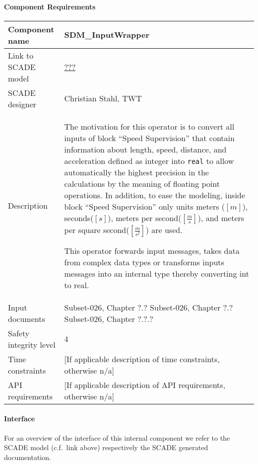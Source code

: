 
\paragraph{Component Requirements}

\begin{longtable}{p{}p{}}
\toprule
Component name			& SDM\_InputWrapper \\
\midrule
Link to SCADE model		& {\footnotesize \url{???}} \\
\midrule
SCADE designer			& Christian Stahl, TWT \\
\midrule
Description				& The motivation for this operator is to convert all inputs of block ``Speed Supervision'' that contain information about length, speed, distance, and acceleration defined as integer into \texttt{real} to allow automatically the highest precision in the calculations by the meaning of floating point operations. In addition, to ease the modeling, inside block ``Speed Supervision'' only units meters ($[m]$), seconds($[s]$), meters per second($[\frac{m}{s}]$), and meters per square second($[\frac{m}{s^{2}}]$) are used.

This operator forwards input messages, takes data from complex data types or transforms inputs messages into an internal type thereby converting int to real. \\
\midrule
Input documents	& 
Subset-026, Chapter ?.?\newline
Subset-026, Chapter ?.?\newline
Subset-026, Chapter ?.?.?\\
\midrule
Safety integrity level		& 4 \\
\midrule
Time constraints		& [If applicable description of time constraints, otherwise n/a] \\
\midrule
API requirements 		& [If applicable description of API requirements, otherwise n/a] \\
\bottomrule
\end{longtable}


\paragraph{Interface}

For an overview of the interface of this internal component we refer to the SCADE model (c.f.~link above) respectively the SCADE generated documentation.